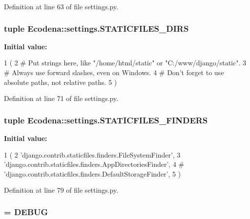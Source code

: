 Definition at line 63 of file settings.py.

\hypertarget{namespace_ecodena_1_1settings_ada22dfac93df1b81c84139ab6f83b7ba}{
\subsubsection[{STATICFILES\_\-DIRS}]{\setlength{\rightskip}{0pt plus 5cm}tuple {\bf Ecodena::settings.STATICFILES\_\-DIRS}}}
\label{d1/d62/namespace_ecodena_1_1settings_ada22dfac93df1b81c84139ab6f83b7ba}
{\bfseries Initial value:}
\begin{DoxyCode}
1 (
2     # Put strings here, like "/home/html/static" or "C:/www/django/static".
3     # Always use forward slashes, even on Windows.
4     # Don't forget to use absolute paths, not relative paths.
5 )
\end{DoxyCode}


Definition at line 71 of file settings.py.

\hypertarget{namespace_ecodena_1_1settings_a687e8077a78925e11f4051c4bee690dc}{
\subsubsection[{STATICFILES\_\-FINDERS}]{\setlength{\rightskip}{0pt plus 5cm}tuple {\bf Ecodena::settings.STATICFILES\_\-FINDERS}}}
\label{d1/d62/namespace_ecodena_1_1settings_a687e8077a78925e11f4051c4bee690dc}
{\bfseries Initial value:}
\begin{DoxyCode}
1 (
2     'django.contrib.staticfiles.finders.FileSystemFinder',
3     'django.contrib.staticfiles.finders.AppDirectoriesFinder',
4 #    'django.contrib.staticfiles.finders.DefaultStorageFinder',
5 )
\end{DoxyCode}


Definition at line 79 of file settings.py.

\hypertarget{namespace_ecodena_1_1settings_a981025bf7ec634a2957feb5a9cce6e17}{
\subsubsection[{TEMPLATE\_\-DEBUG}]{ = {\bf DEBUG}}}
\label{d1/d62/namespace_ecodena_1_1settings_a981025bf7ec634a2957feb5a9cce6e17}


